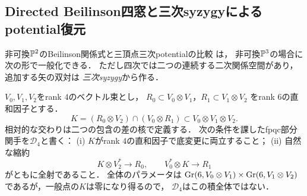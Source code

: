\subsection{Directed Beilinson四窓と三次syzygyによるpotential復元}
\label{subsec:p3-directed-potential}

非可換$\mathbb P^2$のBeilinson関係式と三頂点三次potentialの比較
\cite[\S7, 特に(7.27)--(7.28)]{AOUNCPlanes}は，
非可換$\mathbb P^3$の場合に次の形で一般化できる．
ただし四次では二つの連続する二次関係空間があり，追加する矢の双対は
\emph{三次syzygy}から作る．

$V_0,V_1,V_2$をrank $4$のベクトル束とし，
$R_0\subset V_0\otimes V_1$，$R_1\subset V_1\otimes V_2$
をrank $6$の直和因子とする．
\begin{equation}\label{eq:p3-directed-K}
 K=(R_0\otimes V_2)\cap(V_0\otimes R_1)
 \subset V_0\otimes V_1\otimes V_2.
\end{equation}
相対的な交わりは二つの包含の差の核で定義する．
次の条件を課したfpqc部分関手を$\mathcal D_4$と書く：
(i) $K$がrank $4$の直和因子で底変更に両立すること；
(ii) 自然な縮約
\begin{equation}\label{eq:p3-directed-spanning}
 K\otimes V_2^*\longrightarrow R_0,\qquad
 V_0^*\otimes K\longrightarrow R_1
\end{equation}
がともに全射であること．
全体のパラメータは
$\operatorname{Gr}(6,V_0\otimes V_1)\times\operatorname{Gr}(6,V_1\otimes V_2)$
であるが，一般点の$K$は零になり得るので，
$\mathcal D_4$はこの積全体ではない．

